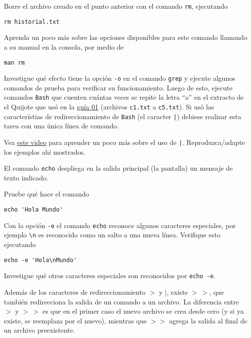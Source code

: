 \documentclass[11pt]{exam}
\begin{document}
\begin{questions}
\item Borre el archivo creado en el punto anterior con el comando \texttt{rm}, ejecutando
\begin{verbatim}
rm historial.txt
\end{verbatim}
Aprenda un poco más sobre las opciones disponibles para este comando llamando a su manual en la consola, por medio de
\begin{verbatim}
man rm
\end{verbatim}
\item Investigue qué efecto tiene la opción \texttt{-o} en el comando \texttt{grep} y ejecute algunos comandos de prueba para verificar su funcionamiento. Luego de esto, ejecute comandos \texttt{Bash} que cuenten cuántas veces se repite la letra ``a'' en el extracto de el Quijote que usó en la \href{https://github.com/gfrubi/CC/tree/master/guias/01}{guía 01} (archivos \texttt{c1.txt} a \texttt{c5.txt}). Si usó las característias de redireccionamiento de \texttt{Bash} (el caracter \texttt{|}) debiese realizar esta tarea con una única línea de comando.

\item Vea \href{https://youtu.be/VSH1XpWN1us}{este video} para aprender un poco más sobre el uso de \texttt{|}. Reproduzca/adapte los ejemplos ahí mostrados.

\item El comando \texttt{echo} despliega en la salida principal (la pantalla) un mensaje de texto indicado.
\begin{parts}
\item Pruebe qué hace el comando 
\begin{verbatim}
echo 'Hola Mundo'
\end{verbatim}
\item Con la opción \texttt{-e} el comando \texttt{echo} reconoce algunos caracteres especiales, por ejemplo \verb|\n| es reconocido como un salto a una nueva línea. Verifique esto ejecutando
\begin{verbatim}
echo -e 'Hola\nMundo'
\end{verbatim}
\item Investigue qué otros caracteres especiales son reconocidos por \texttt{echo -e}.
\end{parts}

\item Además de los caracteres de redireccionamiento $>$ y $\vert$, existe $>\,>$, que también redirecciona la salida de un comando a un archivo. La diferencia entre $>$ y $>\,>$ es que en el primer caso el nuevo archivo se crea desde cero (y si ya existe, se reemplaza por el nuevo), mientras que $>>$ agrega la salida al final de un archivo preexistente.


\end{questions}
\end{document}
